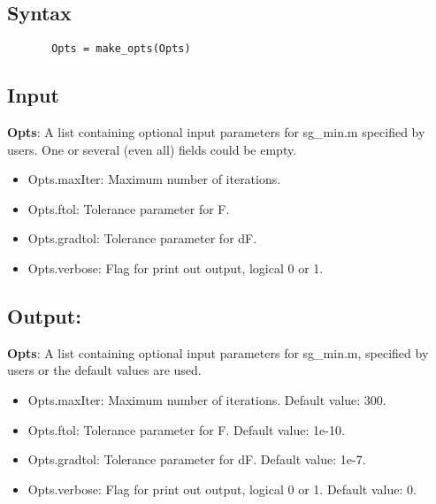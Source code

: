 \documentclass[a4paper,11pt,openany]{memoir}
\begin{document}
\subsection*{Syntax}


\begin{verbatim}       Opts = make_opts(Opts)\end{verbatim}
    

\subsection*{Input}

\begin{par}
\textbf{Opts}: A list containing optional input parameters for sg\_min.m specified by users.  One or several (even all) fields could be empty.
\end{par} \vspace{1em}
\begin{itemize}
\setlength{\itemsep}{-1ex}
   \item Opts.maxIter: Maximum number of iterations.
   \item Opts.ftol: Tolerance parameter for F.
   \item Opts.gradtol: Tolerance parameter for dF.
   \item Opts.verbose: Flag for print out output, logical 0 or 1.
\end{itemize}


\subsection*{Output:}

\begin{par}
\textbf{Opts}: A list containing optional input parameters for sg\_min.m, specified by users or the default values are used.
\end{par} \vspace{1em}
\begin{itemize}
\setlength{\itemsep}{-1ex}
   \item Opts.maxIter: Maximum number of iterations.  Default value: 300.
   \item Opts.ftol: Tolerance parameter for F.  Default value: 1e-10.
   \item Opts.gradtol: Tolerance parameter for dF.  Default value: 1e-7.
   \item Opts.verbose: Flag for print out output, logical 0 or 1. Default value: 0.
\end{itemize}
\end{document}
